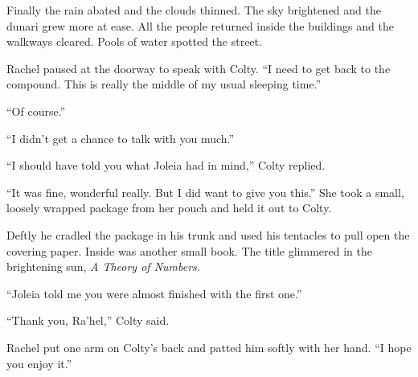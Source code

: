 Finally the rain abated and the clouds thinned. The sky brightened and the dunari grew more at
ease. All the people returned inside the buildings and the walkways cleared. Pools of water
spotted the street.

Rachel paused at the doorway to speak with Colty. ``I need to get back to the compound. This is
really the middle of my usual sleeping time.''

``Of course.''

``I didn't get a chance to talk with you much.''

``I should have told you what Joleia had in mind,'' Colty replied.

``It was fine, wonderful really. But I did want to give you this.'' She took a small, loosely
wrapped package from her pouch and held it out to Colty.

Deftly he cradled the package in his trunk and used his tentacles to pull open the covering
paper. Inside was another small book. The title glimmered in the brightening sun, \textit{A
  Theory of Numbers.}

``Joleia told me you were almost finished with the first one.''

``Thank you, Ra'hel,'' Colty said.

Rachel put one arm on Colty's back and patted him softly with her hand. ``I hope you enjoy it.''
